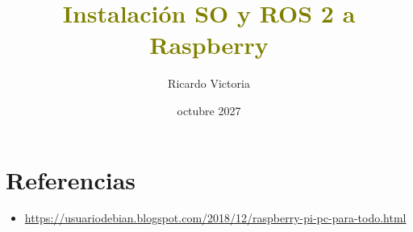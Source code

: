 \documentclass[12pt, letterpaper]{article}
\title{\textbf{\textcolor{olive}{Instalación SO y ROS 2 a Raspberry}}}
\author{Ricardo Victoria}
\date{octubre 2027}
\begin{document}
\maketitle




\section{Referencias}
\begin{itemize}
    \item \url{https://usuariodebian.blogspot.com/2018/12/raspberry-pi-pc-para-todo.html}
\end{itemize}

\end{document}
